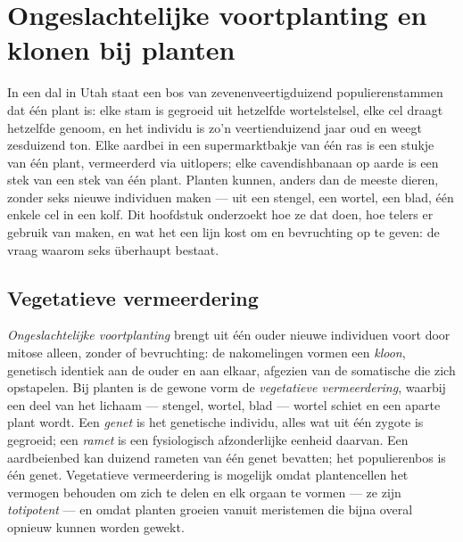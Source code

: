 \chapter{Ongeslachtelijke voortplanting en klonen bij planten}\label{ch:b2:asexual-reproduction}

In een dal in Utah staat een bos van zevenenveertigduizend
populierenstammen dat één plant is: elke stam is gegroeid uit hetzelfde
wortelstelsel, elke cel draagt hetzelfde genoom, en het individu is zo'n
veertienduizend jaar oud en weegt zesduizend ton. Elke aardbei in een
supermarktbakje van één ras is een stukje van één plant, vermeerderd via
uitlopers; elke cavendishbanaan op aarde is een stek van een stek van één
plant. Planten kunnen, anders dan de meeste dieren, zonder seks nieuwe
individuen maken --- uit een stengel, een wortel, een blad, één enkele cel
in een kolf. Dit hoofdstuk onderzoekt hoe ze dat doen, hoe telers er
gebruik van maken, en wat het een lijn kost om  en bevruchting op te
geven: de vraag waarom seks überhaupt bestaat.

\section{Vegetatieve vermeerdering}

\begin{definition}\label{def:b2:asexual-reproduction:clone}
\emph{Ongeslachtelijke voortplanting} brengt uit één ouder nieuwe
individuen voort door mitose alleen, zonder  of bevruchting: de
nakomelingen vormen een \emph{kloon}, genetisch identiek aan de ouder en
aan elkaar, afgezien van de somatische  die zich opstapelen. Bij
planten is de gewone vorm de \emph{vegetatieve vermeerdering}, waarbij een
deel van het lichaam --- stengel, wortel, blad --- wortel schiet en een
aparte plant wordt. Een \emph{genet} is het genetische individu, alles wat
uit één zygote is gegroeid; een \emph{ramet} is een fysiologisch
afzonderlijke eenheid daarvan. Een aardbeienbed kan duizend rameten van één
genet bevatten; het populierenbos is één genet. Vegetatieve vermeerdering
is mogelijk omdat plantencellen het vermogen behouden om zich te delen en
elk orgaan te vormen --- ze zijn \emph{totipotent} --- en omdat planten
groeien vanuit meristemen die bijna overal opnieuw kunnen worden gewekt.
\end{definition}

